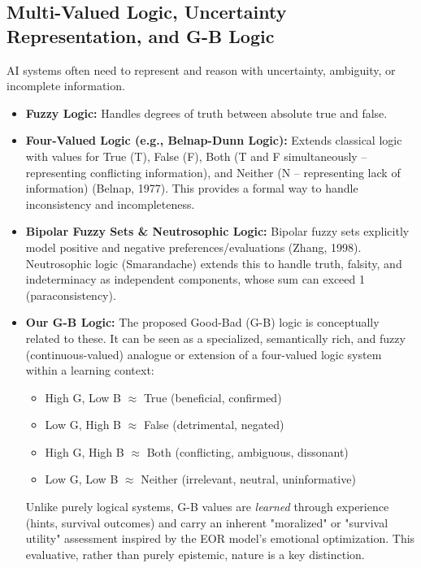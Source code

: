 \documentclass{article}
\begin{document}
\subsection{Multi-Valued Logic, Uncertainty Representation, and G-B Logic}
AI systems often need to represent and reason with uncertainty, ambiguity, or incomplete information.
\begin{itemize}
    \item \textbf{Fuzzy Logic:} Handles degrees of truth between absolute true and false.
    \item \textbf{Four-Valued Logic (e.g., Belnap-Dunn Logic):} Extends classical logic with values for True (T), False (F), Both (T and F simultaneously – representing conflicting information), and Neither (N – representing lack of information) (Belnap, 1977). This provides a formal way to handle inconsistency and incompleteness.
    \item \textbf{Bipolar Fuzzy Sets \& Neutrosophic Logic:} Bipolar fuzzy sets explicitly model positive and negative preferences/evaluations (Zhang, 1998). Neutrosophic logic (Smarandache) extends this to handle truth, falsity, and indeterminacy as independent components, whose sum can exceed 1 (paraconsistency).
    \item \textbf{Our G-B Logic:} The proposed Good-Bad (G-B) logic is conceptually related to these. It can be seen as a specialized, semantically rich, and fuzzy (continuous-valued) analogue or extension of a four-valued logic system within a learning context:
    \begin{itemize}
        \item High G, Low B $\approx$ True (beneficial, confirmed)
        \item Low G, High B $\approx$ False (detrimental, negated)
        \item High G, High B $\approx$ Both (conflicting, ambiguous, dissonant)
        \item Low G, Low B $\approx$ Neither (irrelevant, neutral, uninformative)
    \end{itemize}
    Unlike purely logical systems, G-B values are \textit{learned} through experience (hints, survival outcomes) and carry an inherent "moralized" or "survival utility" assessment inspired by the EOR model's emotional optimization. This evaluative, rather than purely epistemic, nature is a key distinction.
\end{itemize}
\end{document}
